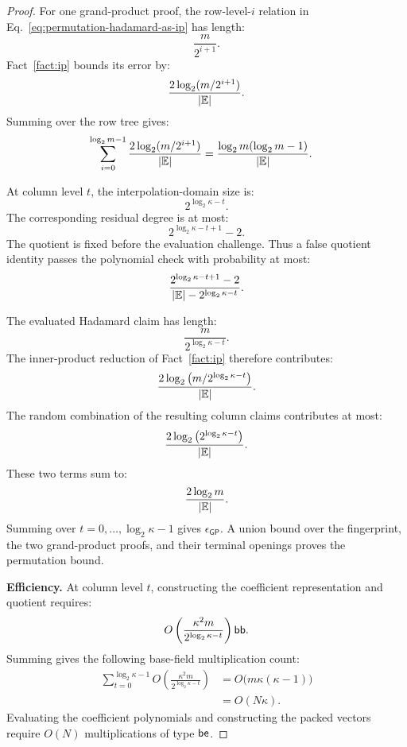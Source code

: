 \begin{proof}
For one grand-product proof, the row-level-\(i\) relation in
Eq.~\eqref{eq:permutation-hadamard-as-ip} has length:
\[
    \frac{m}{2^{i+1}}.
\]
Fact~\ref{fact:ip} bounds its error by:
\[
    \frac{
        2\log_2(m/2^{i+1})
    }{
        |\mathbb{E}|
    }.
\]
Summing over the row tree gives:
\[
\begin{aligned}
    \sum_{i=0}^{\log_2m-1}
    \frac{
        2\log_2(m/2^{i+1})
    }{
        |\mathbb{E}|
    }
    &=
    \frac{
        \log_2m(\log_2m-1)
    }{
        |\mathbb{E}|
    }.
\end{aligned}
\]

At column level \(t\), the interpolation-domain size is:
\[
    2^{\log_2\kappa-t}.
\]
The corresponding residual degree is at most:
\[
    2^{\log_2\kappa-t+1}-2.
\]
The quotient is fixed before the evaluation challenge. Thus a
false quotient identity passes the polynomial check with probability
at most:
\[
    \frac{
        2^{\log_2\kappa-t+1}-2
    }{
        |\mathbb{E}|
        -
        2^{\log_2\kappa-t}
    }.
\]

The evaluated Hadamard claim has length:
\[
    \frac{m}{2^{\log_2\kappa-t}}.
\]
The inner-product reduction of Fact~\ref{fact:ip} therefore
contributes:
\[
    \frac{
        2\log_2
        \left(
            m/2^{\log_2\kappa-t}
        \right)
    }{
        |\mathbb{E}|
    }.
\]
The random combination of the resulting column claims
contributes at most:
\[
    \frac{
        2\log_2
        \left(
            2^{\log_2\kappa-t}
        \right)
    }{
        |\mathbb{E}|
    }.
\]
These two terms sum to:
\[
    \frac{2\log_2m}{|\mathbb{E}|}.
\]
Summing over \(t=0,\ldots,\log_2\kappa-1\) gives
\(\epsilon_{\mathsf{GP}}\). A union bound over the fingerprint,
the two grand-product proofs, and their terminal openings proves
the permutation bound.

\smallskip\noindent\textbf{Efficiency.}
At column level \(t\), constructing the coefficient representation
and quotient requires:
\[
    O\left(
        \frac{
            \kappa^2m
        }{
            2^{\log_2\kappa-t}
        }
    \right)\mathsf{bb}.
\]
Summing gives the following base-field multiplication count:
\[
\begin{aligned}
    \sum_{t=0}^{\log_2\kappa-1}
    O\left(
        \frac{
            \kappa^2m
        }{
            2^{\log_2\kappa-t}
        }
    \right)
    &=
    O\bigl(m\kappa(\kappa-1)\bigr)\\
    &=
    O(N\kappa).
\end{aligned}
\]
Evaluating the coefficient polynomials and constructing the
packed vectors require
\(O(N)\) multiplications of type \(\mathsf{be}\).


\end{proof}
